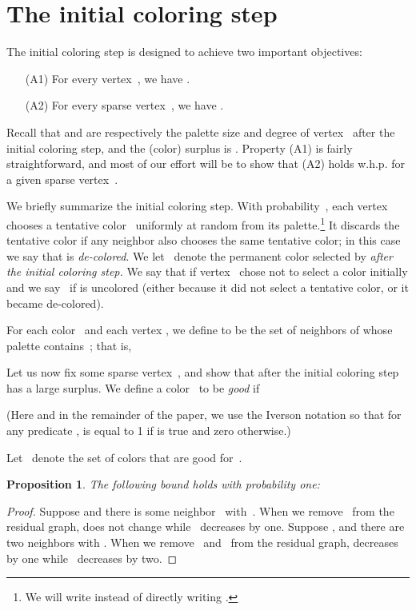 \documentclass[11pt]{amsart}
\newtheorem{proposition}[theorem]{Proposition}
\begin{document}
\section{The initial coloring step}
\label{sec:firstcoloring}
The initial coloring step is designed to achieve two important objectives:
\begin{enumerate}
\item[(A1)] For every vertex~, we have .
\item[(A2)] For every sparse vertex~, we have .
\end{enumerate}
Recall that  and  are respectively the palette size and degree of vertex~ after the initial coloring step, and the (color) surplus is . Property (A1) is fairly straightforward, and most of our effort will be to show that (A2) holds w.h.p. for a given sparse vertex~.

We briefly summarize the initial coloring step. With probability~, each vertex~ chooses a tentative color~ uniformly at random from its palette.\footnote{We will write  instead of directly writing .} It discards the tentative color if any neighbor also chooses the same tentative color; in this case we say that  is \emph{de-colored}. We let~ denote the permanent color selected by  \emph{after the initial coloring step.} We say that  if vertex~ chose not to select a color initially and we say~ if  is uncolored (either because it did not select a tentative color, or it became de-colored).

For each color~ and each vertex , we define  to be the set of neighbors of  whose palette contains~; that is, 

Let us now fix some sparse vertex~, and show that after the initial coloring step~ has a large surplus. We define a color~ to be \emph{good} if

(Here and in the remainder of the paper, we use the Iverson notation so that for any predicate ,   is equal to 1 if  is true and zero otherwise.)

Let~ denote the set of colors that are good for~. 
\begin{proposition}
\label{sparse-prop2}
The following bound holds with probability one:

\end{proposition}
\begin{proof}
Suppose  and there is some neighbor~ with~. When we remove~ from the residual graph,  does not change while~ decreases by one. Suppose , and there are two neighbors  with . When we remove~ and~ from the residual graph,  decreases by one while~ decreases by two.
\end{proof}
\end{document}
